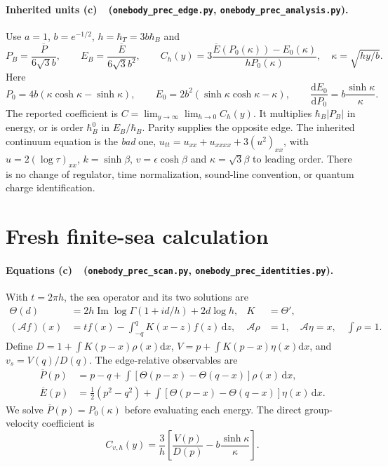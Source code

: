 \documentclass[11pt,a4paper]{article}
\newcommand{\Lc}{\textbf{(c)}\ }
\newcommand{\dd}{\mathrm d}
\newcommand{\scan}{\texttt{onebody\_\allowbreak prec\_\allowbreak scan.py}}
\newcommand{\edge}{\texttt{onebody\_\allowbreak prec\_\allowbreak edge.py}}
\newcommand{\ids}{\texttt{onebody\_\allowbreak prec\_\allowbreak identities.py}}
\newcommand{\ana}{\texttt{onebody\_\allowbreak prec\_\allowbreak analysis.py}}
\begin{document}
\paragraph{Inherited units \Lc\ (\edge, \ana).}
Use $a=1$, $b=e^{-1/2}$, $h=\hbar_T=3b\hbar_B$ and
\begin{equation}
 P_B=\frac{\overline P}{6\sqrt3 b},\qquad
 E_B=\frac{\overline E}{6\sqrt3 b^2},\qquad
 C_h(y)=3\frac{\overline E(P_0(\kappa))-E_0(\kappa)}{hP_0(\kappa)},
 \quad \kappa=\sqrt{hy/b}.
 \label{eq:quantity}
\end{equation}
Here
\begin{equation}
 P_0=4b(\kappa\cosh\kappa-\sinh\kappa),\qquad
 E_0=2b^2(\sinh\kappa\cosh\kappa-\kappa),\qquad
 \frac{\dd E_0}{\dd P_0}=b\frac{\sinh\kappa}{\kappa}.
\end{equation}
The reported coefficient is $C=\lim_{y\to\infty}\lim_{h\to0}C_h(y)$.
It multiplies $\hbar_B|P_B|$ in energy, or is order $\hbar_B^0$ in
$E_B/\hbar_B$. Parity supplies the opposite edge.
The inherited continuum equation is the \emph{bad} one,
$u_{tt}=u_{xx}+u_{xxxx}+3(u^2)_{xx}$, with
$u=2(\log\tau)_{xx}$, $k=\sinh\beta$, $v=\epsilon\cosh\beta$ and
$\kappa=\sqrt3\beta$ to leading order. There is no change of regulator,
time normalization, sound-line convention, or quantum charge identification.

\section{Fresh finite-sea calculation}
\paragraph{Equations \Lc\ (\scan, \ids).}
With $t=2\pi h$, the sea operator and its two solutions are
\begin{align}
 \Theta(d)&=2h\operatorname{Im}\log\Gamma(1+id/h)+2d\log h,
 &K&=\Theta',\\
 (\mathcal Af)(x)&=tf(x)-\int_{-q}^q K(x-z)f(z)\,\dd z,
 &\mathcal A\rho&=1,\quad \mathcal A\eta=x,\quad\int\rho=1.
\end{align}
Define $D=1+\int K(p-x)\rho(x)\dd x$,
$V=p+\int K(p-x)\eta(x)\dd x$, and $v_s=V(q)/D(q)$.
The edge-relative observables are
\begin{align}
 \overline P(p)&=p-q+\int[\Theta(p-x)-\Theta(q-x)]\rho(x)\,\dd x,\\
 \overline E(p)&=\tfrac12(p^2-q^2)
       +\int[\Theta(p-x)-\Theta(q-x)]\eta(x)\,\dd x.
\end{align}
We solve $\overline P(p)=P_0(\kappa)$ before evaluating each energy.
The direct group-velocity coefficient is
\begin{equation}
 C_{v,h}(y)=\frac3h\left[\frac{V(p)}{D(p)}
                         -b\frac{\sinh\kappa}{\kappa}\right].
\end{equation}
\end{document}
